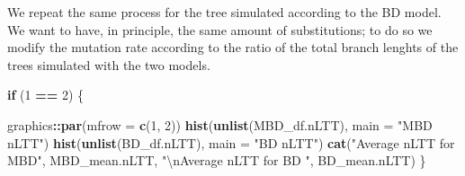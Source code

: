 \documentclass[]{article}
\newenvironment{Shaded}{\begin{snugshade}}{\end{snugshade}}
\newcommand{\KeywordTok}[1]{\textcolor[rgb]{0.13,0.29,0.53}{\textbf{#1}}}
\newcommand{\DataTypeTok}[1]{\textcolor[rgb]{0.13,0.29,0.53}{#1}}
\newcommand{\DecValTok}[1]{\textcolor[rgb]{0.00,0.00,0.81}{#1}}
\newcommand{\CharTok}[1]{\textcolor[rgb]{0.31,0.60,0.02}{#1}}
\newcommand{\StringTok}[1]{\textcolor[rgb]{0.31,0.60,0.02}{#1}}
\newcommand{\ControlFlowTok}[1]{\textcolor[rgb]{0.13,0.29,0.53}{\textbf{#1}}}
\newcommand{\OperatorTok}[1]{\textcolor[rgb]{0.81,0.36,0.00}{\textbf{#1}}}
\newcommand{\NormalTok}[1]{#1}
\begin{document}
We repeat the same process for the tree simulated according to the BD
model. We want to have, in principle, the same amount of substitutions;
to do so we modify the mutation rate according to the ratio of the total
branch lenghts of the trees simulated with the two models.

\begin{Shaded}
\begin{Highlighting}[]
\ControlFlowTok{if}\NormalTok{ (}\DecValTok{1} \OperatorTok{==}\StringTok{ }\DecValTok{2}\NormalTok{) \{}
  
\NormalTok{  graphics}\OperatorTok{::}\KeywordTok{par}\NormalTok{(}\DataTypeTok{mfrow =} \KeywordTok{c}\NormalTok{(}\DecValTok{1}\NormalTok{, }\DecValTok{2}\NormalTok{))}
  \KeywordTok{hist}\NormalTok{(}\KeywordTok{unlist}\NormalTok{(MBD_df.nLTT), }\DataTypeTok{main =} \StringTok{"MBD nLTT"}\NormalTok{)}
  \KeywordTok{hist}\NormalTok{(}\KeywordTok{unlist}\NormalTok{(BD_df.nLTT), }\DataTypeTok{main =} \StringTok{"BD nLTT"}\NormalTok{)}
  \KeywordTok{cat}\NormalTok{(}\StringTok{"Average nLTT for MBD"}\NormalTok{, MBD_mean.nLTT, }\StringTok{"}\CharTok{\textbackslash{}n}\StringTok{Average nLTT for BD "}\NormalTok{, BD_mean.nLTT)}
\NormalTok{\}}
\end{Highlighting}
\end{Shaded}
\end{document}

